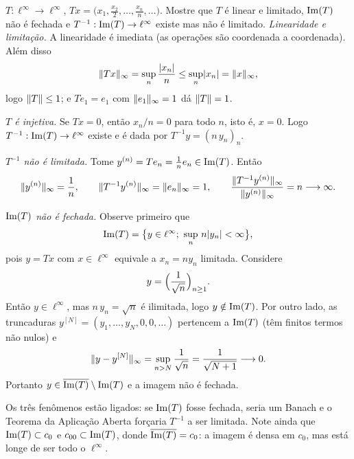 \begin{exercicio}{$T:\ell^\infty\to \ell^\infty$, $Tx=\bigl(x_1,\frac{x_2}{2},\dots,\frac{x_n}{n},\dots\bigr)$. Mostre que $T$ é linear e limitado, $\operatorname{Im}(T)$ não é fechada e $T^{-1}:\operatorname{Im}(T)\to \ell^\infty$ existe mas não é limitado.}
\sol
\emph{Linearidade e limitação.} A linearidade é imediata (as operações são coordenada a coordenada). Além disso
\[ \lVert Tx\rVert_\infty=\sup_{n}\frac{\lvert x_n\rvert}{n}\le\sup_n\lvert x_n\rvert=\lVert x\rVert_\infty, \]
logo $\lVert T\rVert\le1$; e $Te_1=e_1$ com $\lVert e_1\rVert_\infty=1$ dá $\lVert T\rVert=1$.

\emph{$T$ é injetiva.} Se $Tx=0$, então $x_n/n=0$ para todo $n$, isto é, $x=0$. Logo $T^{-1}:\operatorname{Im}(T)\to \ell^\infty$ existe e é dada por $T^{-1}y=(n\,y_n)_n$.

\emph{$T^{-1}$ não é limitada.} Tome $y^{(n)}=Te_n=\frac1ne_n\in\operatorname{Im}(T)$. Então
\[ \lVert y^{(n)}\rVert_\infty=\frac1n, \qquad \lVert T^{-1}y^{(n)}\rVert_\infty=\lVert e_n\rVert_\infty=1, \qquad \frac{\lVert T^{-1}y^{(n)}\rVert_\infty}{\lVert y^{(n)}\rVert_\infty}=n\longrightarrow\infty. \]

\emph{$\operatorname{Im}(T)$ não é fechada.} Observe primeiro que
\[ \operatorname{Im}(T)=\bigl\{y\in \ell^\infty;\ \sup_n\,n\lvert y_n\rvert<\infty\bigr\}, \]
pois $y=Tx$ com $x\in \ell^\infty$ equivale a $x_n=ny_n$ limitada. Considere
\[ y=\Bigl(\frac{1}{\sqrt n}\Bigr)_{n\ge1}. \]
Então $y\in \ell^\infty$, mas $n\,y_n=\sqrt n$ é ilimitada, logo $y\notin\operatorname{Im}(T)$. Por outro lado, as truncaduras $y^{[N]}=(y_1,\dots,y_N,0,0,\dots)$ pertencem a $\operatorname{Im}(T)$ (têm finitos termos não nulos) e
\[ \lVert y-y^{[N]}\rVert_\infty=\sup_{n>N}\frac{1}{\sqrt n}=\frac{1}{\sqrt{N+1}}\longrightarrow0. \]
Portanto $y\in\overline{\operatorname{Im}(T)}\setminus\operatorname{Im}(T)$ e a imagem não é fechada.

\begin{obs}
Os três fenômenos estão ligados: se $\operatorname{Im}(T)$ fosse fechada, seria um Banach e o Teorema da Aplicação Aberta forçaria $T^{-1}$ a ser limitada. Note ainda que $\operatorname{Im}(T)\subset c_0$ e $c_{00}\subset\operatorname{Im}(T)$, donde $\overline{\operatorname{Im}(T)}=c_0$: a imagem é densa em $c_0$, mas está longe de ser todo o $\ell^\infty$.
\end{obs}
\end{exercicio}

